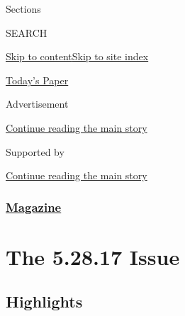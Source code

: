 Sections

SEARCH

\protect\hyperlink{site-content}{Skip to
content}\protect\hyperlink{site-index}{Skip to site index}

\href{https://myaccount.nytimes3xbfgragh.onion/auth/login?response_type=cookie\&client_id=vi}{}

\href{https://www.nytimes3xbfgragh.onion/section/todayspaper}{Today's
Paper}

Advertisement

\protect\hyperlink{after-top}{Continue reading the main story}

Supported by

\protect\hyperlink{after-sponsor}{Continue reading the main story}

\hypertarget{magazine}{%
\subsubsection{\texorpdfstring{\href{/section/magazine}{Magazine}}{Magazine}}\label{magazine}}

\hypertarget{the-52817-issue}{%
\section{The 5.28.17 Issue}\label{the-52817-issue}}

\hypertarget{highlights}{%
\subsection{Highlights}\label{highlights}}

